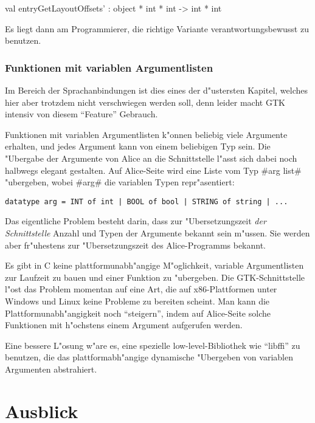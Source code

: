 \documentclass[a4paper,titlepage]{article}
\newenvironment{code}{\verbatim}{\endverbatim}
\begin{document}
\begin{code}
val entryGetLayoutOffsets' : object * int * int -> int * int
\end{code}

Es liegt dann am Programmierer, die richtige Variante verantwortungsbewusst
zu benutzen.

\subsubsection*{Funktionen mit variablen Argumentlisten}

Im Bereich der Sprachanbindungen ist dies eines der d"ustersten Kapitel,
welches hier aber trotzdem nicht verschwiegen werden soll, denn leider
macht GTK intensiv von diesem ``Feature'' Gebrauch.

Funktionen mit variablen Argumentlisten k"onnen beliebig viele Argumente
erhalten, und jedes Argument kann von einem beliebigen Typ sein.
Die "Ubergabe der Argumente von Alice an die Schnittstelle l"asst sich dabei
noch halbwegs elegant gestalten. Auf Alice-Seite wird eine Liste vom Typ
#arg list# "ubergeben, wobei #arg# die variablen Typen repr"asentiert:

\begin{verbatim}
datatype arg = INT of int | BOOL of bool | STRING of string | ...
\end{verbatim}

Das eigentliche Problem besteht darin, dass zur "Ubersetzungszeit
\emph{der Schnittstelle} Anzahl und Typen der Argumente bekannt sein m"ussen.
Sie werden aber fr"uhestens zur "Ubersetzungszeit des
Alice-Programms bekannt.

Es gibt in C keine plattformunabh"angige M"oglichkeit,
variable Argumentlisten zur Laufzeit zu bauen und einer Funktion zu "ubergeben.
Die GTK-Schnittstelle l"ost das Problem momentan auf eine Art, die
auf x86-Plattformen unter Windows und Linux keine Probleme
zu bereiten scheint. Man kann die Plattformunabh"angigkeit noch ``steigern'',
indem auf Alice-Seite solche Funktionen mit h"ochstens einem Argument
aufgerufen werden.

Eine bessere L"osung w"are es, eine spezielle low-level-Bibliothek
wie ``libffi'' zu benutzen, die das plattformabh"angige dynamische "Ubergeben
von variablen Argumenten abstrahiert.


\section{Ausblick}
\end{document}
